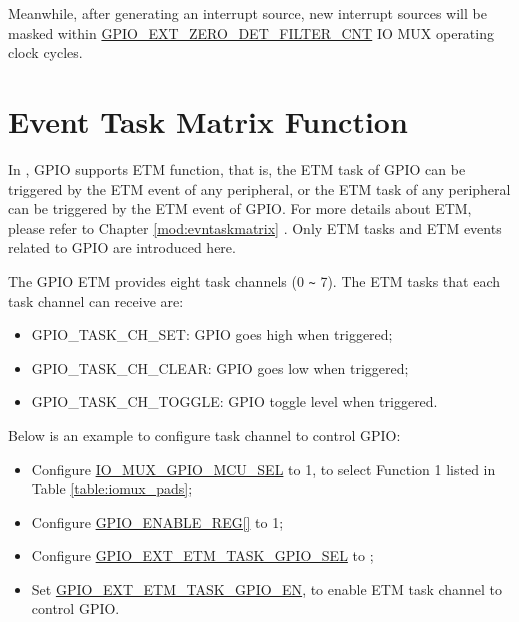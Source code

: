 \documentclass[main\_\_EN.tex]{subfiles}
\begin{document}
Meanwhile, after generating an interrupt source, new interrupt sources will be masked within \hyperref[fielddesc:GPIOSDZERODETFILTERCNT]{GPIO\_EXT\_ZERO\_DET\_FILTER\_CNT} IO MUX operating clock cycles.

\section{Event Task Matrix Function}



In \chipname{} , GPIO supports ETM function, that is, the ETM task of GPIO can be triggered by the ETM event of any peripheral, or the ETM task of any peripheral can be triggered by the ETM event of GPIO. For more details about ETM, please refer to Chapter \ref{mod:evntaskmatrix} \textit{}. Only ETM tasks and ETM events related to GPIO are introduced here.

The GPIO ETM provides eight task channels  (0 \verb+~+ 7). The ETM tasks that each task channel can receive are:

\begin{itemize}
    \item GPIO\_TASK\_CH\_SET: GPIO goes high when triggered;
    \item GPIO\_TASK\_CH\_CLEAR: GPIO goes low when triggered;
    \item GPIO\_TASK\_CH\_TOGGLE: GPIO toggle level when triggered.
\end{itemize}

Below is an example to configure task channel   to control GPIO:

\begin{itemize}
    \item Configure \hyperref[fielddesc:IOMUXGPIONMCUSEL]{IO\_MUX\_GPIO\_MCU\_SEL} to 1, to select Function 1 listed in Table \ref{table:iomux_pads};
    \item Configure \hyperref[regdesc:GPIOENABLEREG]{GPIO\_ENABLE\_REG[]} to 1;
    \item Configure \hyperref[fielddesc:GPIOSDETMTASKGPIO0SEL]{GPIO\_EXT\_ETM\_TASK\_GPIO\_SEL} to ;
    \item Set \hyperref[fielddesc:GPIOSDETMTASKGPIO0EN]{GPIO\_EXT\_ETM\_TASK\_GPIO\_EN}, to enable ETM task channel  to control GPIO.
\end{itemize}
\end{document}
